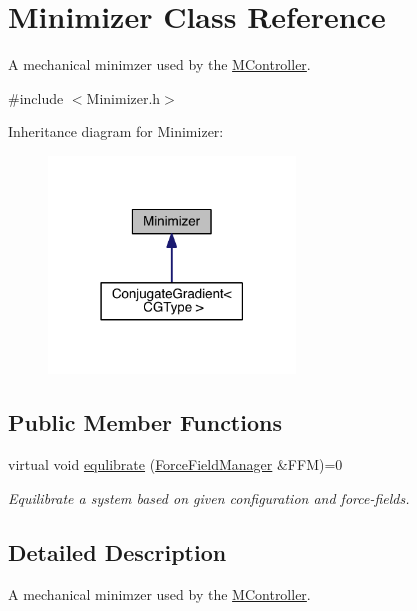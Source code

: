 \hypertarget{classMinimizer}{\section{Minimizer Class Reference}
\label{classMinimizer}
}


A mechanical minimzer used by the \hyperlink{classMController}{M\+Controller}.  




{\ttfamily \#include $<$Minimizer.\+h$>$}



Inheritance diagram for Minimizer\+:\nopagebreak
\begin{figure}[H]
\begin{center}
\leavevmode
\includegraphics[width=186pt]{classMinimizer__inherit__graph}
\end{center}
\end{figure}
\subsection*{Public Member Functions}
\begin{DoxyCompactItemize}
\item 
virtual void \hyperlink{classMinimizer_ae7a86f3d2c59c646b3c8d3381ac95ac4}{equlibrate} (\hyperlink{classForceFieldManager}{Force\+Field\+Manager} \&F\+F\+M)=0
\begin{DoxyCompactList}\small\item\em Equilibrate a system based on given configuration and force-\/fields. \end{DoxyCompactList}\end{DoxyCompactItemize}


\subsection{Detailed Description}
A mechanical minimzer used by the \hyperlink{classMController}{M\+Controller}. 

